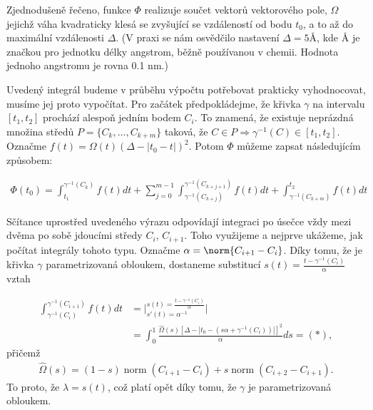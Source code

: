 Zjednodušeně řečeno, funkce $ \Phi $ realizuje součet vektorů vektorového pole,
$ \Omega $ jejichž váha kvadraticky klesá se zvyšující se vzdáleností od bodu
$ t_0 $, a to až do maximální vzdálenosti $ \Delta $. (V praxi se nám osvědčilo
nastavení $ \Delta = 5 Å $, kde Å je značkou pro jednotku délky angstrom, běžně
používanou v chemii. Hodnota jednoho angstromu je rovna 0.1 nm.)

Uvedený integrál budeme v průběhu výpočtu potřebovat prakticky vyhodnocovat,
musíme jej proto vypočítat. Pro začátek předpokládejme, že křivka $ \gamma $ na
intervalu $ [t_1, t_2] $ prochází alespoň jedním bodem $ C_i $. To znamená, že
existuje neprázdná množina středů $ {P = \{C_k, \dots, C_{k + m} \} }$ taková, že
$ C \in P \Rightarrow \gamma^{-1}(C) \in [t_1, t_2]$. Označme
$ f(t) = \Omega(t) (\Delta - \left| t_0 - t \right| )^2 $. Potom $ \Phi $ můžeme zapsat
následujícím způsobem:

\begin{align} \label{eq:integral_sum}
    \Phi(t_0) = \int_{t_1}^{\gamma^{-1}(C_k)} f(t) dt
        + \sum_{j=0}^{m - 1} \int_{\gamma^{-1}(C_{k + j})}^{\gamma^{-1}(C_{k + j + 1})} f(t) dt
        + \int_{\gamma^{-1}(C_{k + m})}^{t_2} f(t) dt
\end{align}

Sčítance uprostřed uvedeného výrazu odpovídají integraci po úsečce vždy mezi
dvěma po sobě jdoucími středy $ C_i $, $C_{i+1} $. Toho využijeme a nejprve ukážeme,
jak počítat integrály tohoto typu. Označme $\alpha = \norm{C_{i + 1} - C_i}$.
Díky tomu, že je křivka $ \gamma $ parametrizovaná
obloukem, dostaneme substitucí
$ s(t) = \frac{t - \gamma^{-1}(C_i)}{\alpha} $ vztah

\begin{align*}
    \int_{\gamma^{-1}(C_{i})}^{\gamma^{-1}(C_{i + 1})} f(t) dt
    &= \bigg\rvert
        ^{s(t) = \frac{t - \gamma^{-1}(C_i)}{\alpha}}
        _{s'(t) = \alpha^{-1}} \bigg\lvert \\
    &= \int_{0}^{1}
        \frac{\widehat{\Omega}(s)
            \left[\Delta - \left| t_0 - (s \alpha + \gamma^{-1}(C_i)) \right| \right]^2}
        {\alpha} ds
    = (*),
\end{align*}
přičemž
\begin{align*}
    \widehat{\Omega}(s) = (1 - s) \operatorname{norm}(C_{i + 1} - C_i)
            + s \operatorname{norm}(C_{i + 2} - C_{i + 1}).
\end{align*}
To proto, že $ \lambda = s(t) $, což platí opět díky tomu, že $ \gamma $ je
parametrizovaná obloukem.

